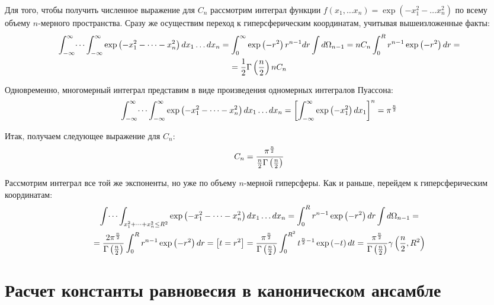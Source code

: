 \documentclass[14pt]{article}
\newcommand{\lb}{\left(}
\newcommand{\rb}{\right)}
\begin{document}
Для того, чтобы получить численное выражение для $C_n$ рассмотрим интеграл функции $f(x_1, \dots x_n) = \exp \lb -x_1^2 - \dots x_n^2 \rb$ по всему объему $n$-мерного пространства. Сразу же осуществим переход к гиперсферическим координатам, учитывая вышеизложенные факты:
\begin{gather}
	\int_{-\infty}^{\infty} \dots \int_{-\infty}^{\infty} \exp \lb -x_1^2 - \dots -x_n^2 \rb dx_1 \dots dx_n = \int_{0}^{\infty} \exp \lb -r^2 \rb r^{n-1} dr \int d \Omega_{n-1}  = n C_n \int_{0}^{R} r^{n-1} \exp \lb -r^2 \rb dr= \notag \\
	= \frac{1}{2} \Gamma \lb \frac{n}{2} \rb n C_n \notag
\end{gather}

Одновременно, многомерный интеграл представим в виде произведения одномерных интегралов Пуассона:
\begin{gather}
	\int_{-\infty}^{\infty} \dots \int_{-\infty}^{\infty} \exp \lb -x_1^2 - \dots - x_n^2 \rb d x_1 \dots dx_n = \left[ \int_{-\infty}^{\infty} \exp \lb -x_1^2 \rb dx_1 \right]^n  = \pi^\frac{n}{2} \notag 
\end{gather}

Итак, получаем следующее выражение для $C_n$:
\begin{gather}
	C_n = \frac{\pi^\frac{n}{2}}{\frac{n}{2} \Gamma \lb \frac{n}{2} \rb} \notag
\end{gather}

Рассмотрим интеграл все той же экспоненты, но уже по объему $n$-мерной гиперсферы. Как и раньше, перейдем к гиперсферическим координатам:
\begin{gather}
	\int \dots \int_{x_1^2 + \dots + x_n^2 \leq R^2} \exp \lb -x_1^2 - \dots - x_n^2 \rb dx_1 \dots dx_n = \int_{0}^{R} r^{n-1} \exp \lb -r^2 \rb dr \int d \Omega_{n-1} = \notag \\
	= \frac{2 \pi^{\frac{n}{2}}}{\Gamma \lb \frac{n}{2} \rb} \int_{0}^{R} r^{n-1} \exp \lb -r^2 \rb dr = \left[ t = r^2 \right] = \frac{\pi^{\frac{n}{2}}}{\Gamma \lb \frac{n}{2} \rb} \int_{0}^{R^2} t^{\frac{n}{2} - 1} \exp \lb -t \rb dt = \frac{\pi^{\frac{n}{2}}}{\Gamma \lb \frac{n}{2} \rb} \gamma \lb \frac{n}{2}, R^2 \rb \notag
\end{gather}

\newpage

\section*{Расчет константы равновесия в каноническом ансамбле}
\end{document}
